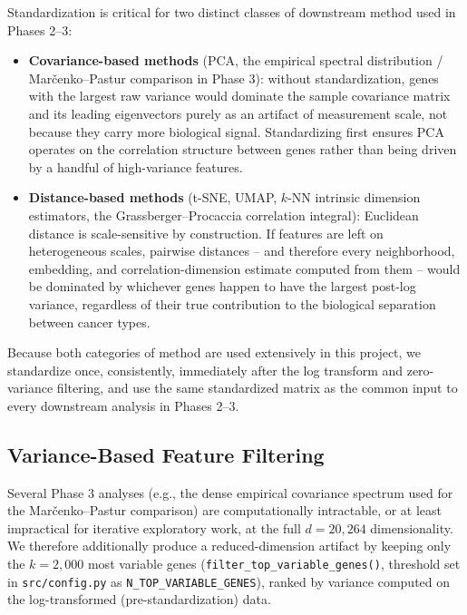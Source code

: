 \documentclass[11pt]{article}
\begin{document}
Standardization is critical for two distinct classes of downstream
method used in Phases 2--3:

\begin{itemize}
  \item \textbf{Covariance-based methods} (PCA, the empirical spectral
  distribution / Marčenko--Pastur comparison in Phase 3): without
  standardization, genes with the largest raw variance would
  dominate the sample covariance matrix and its leading eigenvectors
  purely as an artifact of measurement scale, not because they carry
  more biological signal. Standardizing first ensures PCA operates on
  the correlation structure between genes rather than being driven by a
  handful of high-variance features.
  \item \textbf{Distance-based methods} (t-SNE, UMAP, $k$-NN intrinsic
  dimension estimators, the Grassberger--Procaccia correlation
  integral): Euclidean distance is scale-sensitive by construction. If
  features are left on heterogeneous scales, pairwise distances --
  and therefore every neighborhood, embedding, and correlation-dimension
  estimate computed from them -- would be dominated by whichever genes
  happen to have the largest post-log variance, regardless of their
  true contribution to the biological separation between cancer types.
\end{itemize}

Because both categories of method are used extensively in this project,
we standardize once, consistently, immediately after the log transform
and zero-variance filtering, and use the same standardized matrix as the
common input to every downstream analysis in Phases 2--3.

\subsection{Variance-Based Feature Filtering}
\label{sec:filtering}

Several Phase 3 analyses (e.g., the dense empirical covariance spectrum
used for the Marčenko--Pastur comparison) are computationally
intractable, or at least impractical for iterative exploratory work, at
the full $d = 20{,}264$ dimensionality. We therefore additionally produce
a reduced-dimension artifact by keeping only the
$k = 2{,}000$ most variable genes (\texttt{filter\_top\_variable\_genes()},
threshold set in \texttt{src/config.py} as
\texttt{N\_TOP\_VARIABLE\_GENES}), ranked by variance computed on the
log-transformed (pre-standardization) data.
\end{document}
